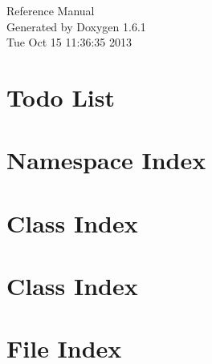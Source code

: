 \documentclass[a4paper]{book}
\begin{document}
\hypersetup{pageanchor=false}
\begin{titlepage}
\vspace*{7cm}
\begin{center}
{\Large Reference Manual}\\
\vspace*{1cm}
{\large Generated by Doxygen 1.6.1}\\
\vspace*{0.5cm}
{\small Tue Oct 15 11:36:35 2013}\\
\end{center}
\end{titlepage}
\clearemptydoublepage
{}
\tableofcontents
\clearemptydoublepage
{}
\hypersetup{pageanchor=true}
\chapter{Todo List}
\label{todo}
\hypertarget{todo}{}

\chapter{Namespace Index}

\chapter{Class Index}

\chapter{Class Index}

\chapter{File Index}

\end{document}
